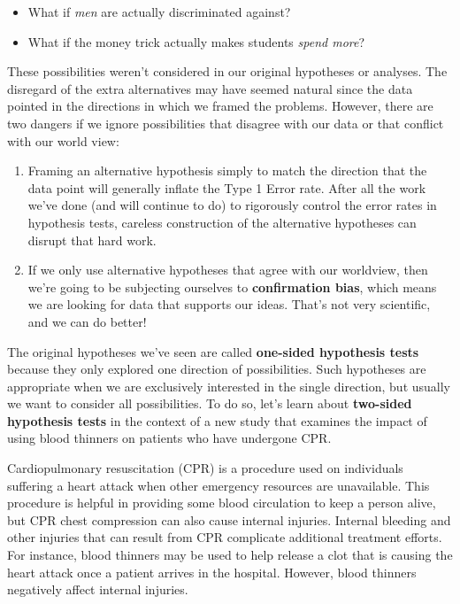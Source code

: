 \documentclass[
  10pt,
  openany]{book}
\providecommand{\tightlist}{%
  \setlength{\itemsep}{0pt}\setlength{\parskip}{0pt}}
\begin{document}
\begin{itemize}
\tightlist
\item
  What if \emph{men} are actually discriminated against?
\item
  What if the money trick actually makes students \emph{spend more}?
\end{itemize}

These possibilities weren't considered in our original hypotheses or analyses.
The disregard of the extra alternatives may have seemed natural since the data pointed in the directions in which we framed the problems.
However, there are two dangers if we ignore possibilities that disagree with our data or that conflict with our world view:

\begin{enumerate}
\def\labelenumi{\arabic{enumi}.}
\item
  Framing an alternative hypothesis simply to match the direction that the data point will generally inflate the Type 1 Error rate.
  After all the work we've done (and will continue to do) to rigorously control the error rates in hypothesis tests, careless construction of the alternative hypotheses can disrupt that hard work.
\item
  If we only use alternative hypotheses that agree with our worldview, then we're going to be subjecting ourselves to \textbf{confirmation bias}, which means we are looking for data that supports our ideas.
  That's not very scientific, and we can do better!
\end{enumerate}

The original hypotheses we've seen are called \textbf{one-sided hypothesis tests} because they only explored one direction of possibilities.
Such hypotheses are appropriate when we are exclusively interested in the single direction, but usually we want to consider all possibilities.
To do so, let's learn about \textbf{two-sided hypothesis tests} in the context of a new study that examines the impact of using blood thinners on patients who have undergone CPR.

Cardiopulmonary resuscitation (CPR) is a procedure used on individuals suffering a heart attack when other emergency resources are unavailable.
This procedure is helpful in providing some blood circulation to keep a person alive, but CPR chest compression can also cause internal injuries.
Internal bleeding and other injuries that can result from CPR complicate additional treatment efforts.
For instance, blood thinners may be used to help release a clot that is causing the heart attack once a patient arrives in the hospital.
However, blood thinners negatively affect internal injuries.
\end{document}
